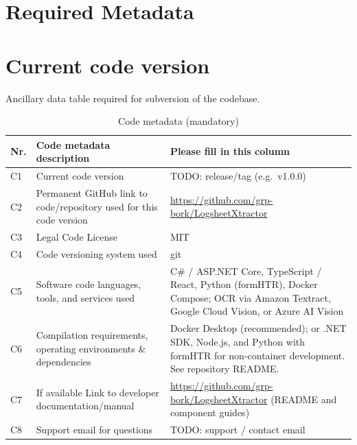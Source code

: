 \documentclass[preprint,12pt,a4paper]{elsarticle}
\begin{document}
\section*{Required Metadata}
\label{sec:metadata}

\section*{Current code version}
\label{sec:code-version}

Ancillary data table required for subversion of the codebase.

\begin{table}[!h]
\begin{tabular}{|l|p{6.5cm}|p{6.5cm}|}
\hline
\textbf{Nr.} & \textbf{Code metadata description} & \textbf{Please fill in this column} \\
\hline
C1 & Current code version & TODO: release/tag (e.g.\ v1.0.0) \\
\hline
C2 & Permanent GitHub link to code/repository used for this code version & \url{https://github.com/grp-bork/LogsheetXtractor} \\
\hline
C3 & Legal Code License & MIT \\
\hline
C4 & Code versioning system used & git \\
\hline
C5 & Software code languages, tools, and services used & C\# / ASP.NET Core, TypeScript / React, Python (formHTR), Docker Compose; OCR via Amazon Textract, Google Cloud Vision, or Azure AI Vision \\
\hline
C6 & Compilation requirements, operating environments \& dependencies & Docker Desktop (recommended); or .NET SDK, Node.js, and Python with formHTR for non-container development. See repository README. \\
\hline
C7 & If available Link to developer documentation/manual & \url{https://github.com/grp-bork/LogsheetXtractor} (README and component guides) \\
\hline
C8 & Support email for questions & TODO: support / contact email \\
\hline
\end{tabular}
\caption{Code metadata (mandatory)}
\label{tab:code-metadata}
\end{table}

\end{document}
